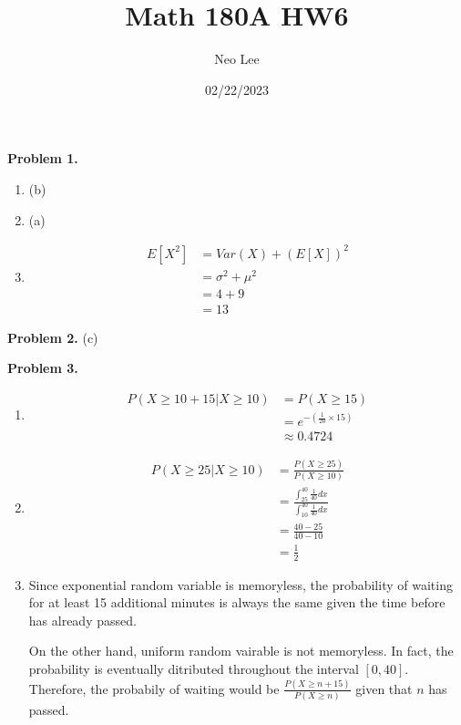 \documentclass{article}
\title{Math 180A HW6}
\author{Neo Lee}
\date{02/22/2023}
\begin{document}
 

\maketitle 

\textbf{Problem 1.}
\begin{enumerate}
    \item (b)
    \item (a)
    \item 
    \begin{align}
        E[X^2] & = Var(X)+\left(E[X]\right)^2 \\
        & = \sigma^2+\mu^2 \\
        & = 4 + 9 \\
        & = 13
    \end{align}
\end{enumerate}
\bigbreak

\textbf{Problem 2.} (c)
\bigbreak

\textbf{Problem 3.} 
\begin{enumerate}[label={(\alph*)}]
    \item 
    \begin{align}
        P(X\ge 10 + 15|X\ge 10) & = P(X\ge 15) \\ 
        & = e^{-(\frac{1}{20}\times 15)} \\
        & \approx 0.4724
    \end{align}

    \item 
    \begin{align}
        P(X \ge 25|X\ge 10) & = \frac{P(X\ge 25)}{P(X\ge 10)} \\
        & = \frac{\int_{25}^{40}\frac{1}{40}dx}{\int_{10}^{40}\frac{1}{40}dx} \\
        & = \frac{40-25}{40-10} \\
        & = \frac{1}{2}
    \end{align}

    \item 
    Since exponential random variable is memoryless, the probability of waiting for at least 15 additional minutes is always the same given the time before has already passed.

    On the other hand, uniform random vairable is not memoryless. In fact, the probability is eventually ditributed throughout the interval $[0,40]$.
    Therefore, the probabily of waiting would be $\frac{P(X\ge n+15)}{P(X\ge n)}$ given that $n$ has passed.
\end{enumerate}
\pagebreak
\end{document}
